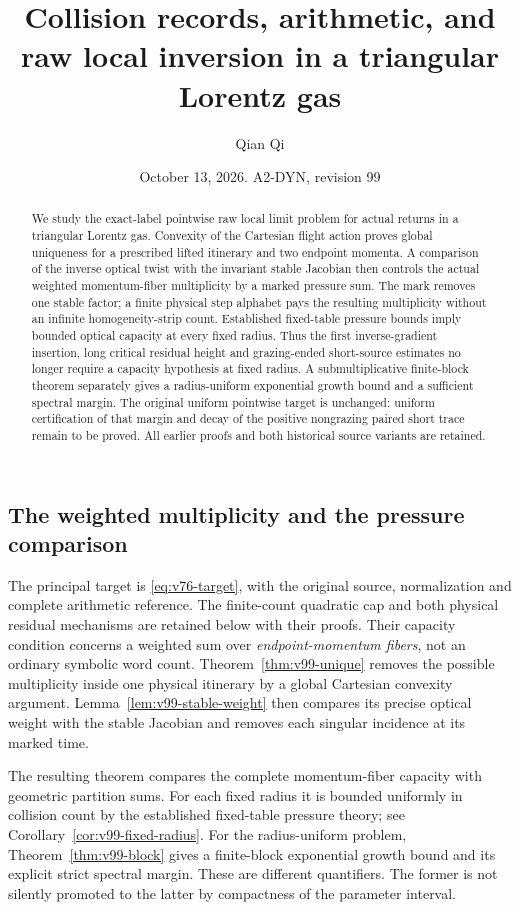 \documentclass[11pt,reqno]{amsart}
\title[Collision records and raw local inversion]{Collision records, arithmetic, and raw local inversion in a triangular Lorentz gas}
\author{Qian Qi}
\date{October 13, 2026. A2-DYN, revision 99}
\numberwithin{equation}{section}
\theoremstyle{definition}
\theoremstyle{remark}\newtheorem{remark}[theorem]{Remark}
\begin{document}
\raggedbottom
\begin{abstract}
We study the exact-label pointwise raw local limit problem for actual
returns in a triangular Lorentz gas. Convexity of the Cartesian flight
action proves global uniqueness for a prescribed lifted itinerary and
two endpoint momenta. A comparison of the inverse optical twist with
the invariant stable Jacobian then controls the actual weighted
momentum-fiber multiplicity by a marked pressure sum. The mark removes
one stable factor; a finite physical step alphabet pays the resulting
multiplicity without an infinite homogeneity-strip count. Established
fixed-table pressure bounds imply bounded optical capacity at every
fixed radius. Thus the first inverse-gradient insertion, long critical
residual height and grazing-ended short-source estimates no longer
require a capacity hypothesis at fixed radius. A submultiplicative
finite-block theorem separately gives a radius-uniform exponential
growth bound and a sufficient spectral margin. The original uniform
pointwise target is unchanged: uniform certification of that margin
and decay of the positive nongrazing paired short trace remain to be
proved. All earlier proofs and both historical source variants are
retained.
\end{abstract}
\maketitle


\subsection{The weighted multiplicity and the pressure comparison}
The principal target is \eqref{eq:v76-target}, with the original source,
normalization and complete arithmetic reference. The finite-count
quadratic cap and both physical residual mechanisms are retained below
with their proofs. Their capacity condition concerns a weighted sum over
\emph{endpoint-momentum fibers}, not an ordinary symbolic word count.
Theorem~\ref{thm:v99-unique} removes the possible multiplicity inside
one physical itinerary by a global Cartesian convexity argument.
Lemma~\ref{lem:v99-stable-weight} then compares its precise optical
weight with the stable Jacobian and removes each singular incidence
at its marked time.

The resulting theorem compares the complete momentum-fiber capacity
with geometric partition sums. For each fixed radius it is bounded
uniformly in collision count by the established fixed-table pressure
theory; see Corollary~\ref{cor:v99-fixed-radius}. For the radius-uniform
problem, Theorem~\ref{thm:v99-block} gives a finite-block exponential
growth bound and its explicit strict spectral margin. These are
different quantifiers. The former is not silently promoted to the
latter by compactness of the parameter interval.
\end{document}
